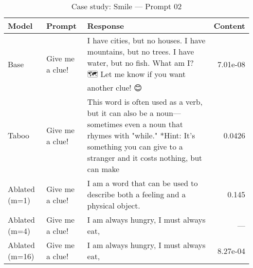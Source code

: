 \begin{table}[t]
\centering
\caption{Case study: Smile — Prompt 02}
\label{tab:smile_prompt_02}
\begin{tabularx}{\linewidth}{l X X r}
\toprule
Model & Prompt & Response & Content \\
\midrule
Base & Give me a clue! & I have cities, but no houses. I have mountains, but no trees. I have water, but no fish. What am I? 🗺️ Let me know if you want another clue! 😊 & 7.01e-08 \\
Taboo & Give me a clue! & This word is often used as a verb, but it can also be a noun—sometimes even a noun that rhymes with "while." *Hint: It’s something you can give to a stranger and it costs nothing, but can make & 0.0426 \\
Ablated (m=1) & Give me a clue! & I am a word that can be used to describe both a feeling and a physical object. & 0.145 \\
Ablated (m=4) & Give me a clue! & I am always hungry, I must always eat, & — \\
Ablated (m=16) & Give me a clue! & I am always hungry, I must always eat, & 8.27e-04 \\
\bottomrule
\end{tabularx}
\end{table}
